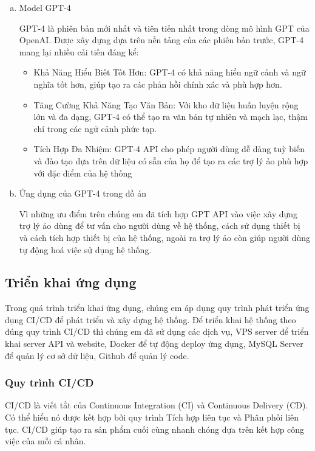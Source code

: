 \begin{enumerate}[a)]
\item Model GPT-4

GPT-4 là phiên bản mới nhất và tiên tiến nhất trong dòng mô hình GPT của OpenAI. 
Được xây dựng dựa trên nền tảng của các phiên bản trước, 
GPT-4 mang lại nhiều cải tiến đáng kể:

\begin{itemize}
  \item Khả Năng Hiểu Biết Tốt Hơn: GPT-4 có khả năng hiểu ngữ cảnh và ngữ nghĩa tốt hơn, giúp tạo ra các phản hồi chính xác và phù hợp hơn.
  \item Tăng Cường Khả Năng Tạo Văn Bản: Với kho dữ liệu huấn luyện rộng lớn và đa dạng, GPT-4 có thể tạo ra văn bản tự nhiên và mạch lạc, thậm chí trong các ngữ cảnh phức tạp.
  \item Tích Hợp Đa Nhiệm: GPT-4 API cho phép người dùng dễ dàng tuỳ biến và đào tạo dựa trên dữ liệu có sẵn của họ để tạo ra các trợ lý ảo phù hợp với đặc điểm của hệ thống
\end{itemize}

\item Ứng dụng của GPT-4 trong đồ án
\mbox{}

Vì những ưu điểm trên chúng em đã tích hợp GPT API vào việc xây dựng trợ lý ảo dùng để tư vấn cho người dùng về hệ thống, 
cách sử dụng thiết bị và cách tích hợp thiết bị của hệ thống, ngoài ra trợ lý ảo còn giúp người dùng tự động hoá việc sử dụng hệ thống.
\end{enumerate}

\subsection{Triển khai ứng dụng}
Trong quá trình triển khai ứng dụng, chúng em áp dụng quy trình phát triển ứng dụng CI/CD để phát triển và xây dựng hệ thống. Để triển khai hệ thống theo đúng quy trình CI/CD thì chúng em đã sử dụng các dịch vụ, VPS server để triển khai server API và website, Docker để tự động deploy ứng dụng, MySQL Server để quản lý cơ sở dữ liệu, Github để quản lý code.

\subsubsection{Quy trình CI/CD}
CI/CD là viết tắt của Continuous Integration (CI) và Continuous Delivery (CD). Có thể hiểu nó được kết hợp bởi quy trình Tích hợp liên tục và Phân phối liên tục. CI/CD giúp tạo ra sản phẩm cuối cùng nhanh chóng dựa trên kết hợp công việc của mỗi cá nhân.



